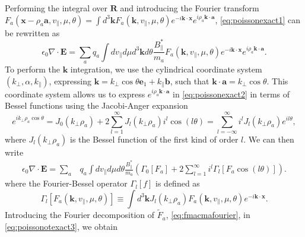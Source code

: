 {{Performing the integral over $\mathbf R$ and introducing the Fourier transform $F_a(\mathbf x - \rho_a \mathbf a,v_\parallel, \mu, \theta) = \int d^3\mathbf k F_a(\mathbf k,v_\parallel, \mu, \theta) e^{-i \mathbf k \cdot \mathbf x} e^{i \rho_a \mathbf k \cdot \mathbf a}$, \cref{eq:poissonexact1} can be rewritten as
%
\begin{equation}
    \epsilon_0 \nabla \cdot \mathbf E = \sum_a q_a \int  dv_\parallel d\mu d^3 \mathbf k d\theta \frac{B_\parallel^*}{m_a} F_a(\mathbf k, v_\parallel, \mu, \theta)e^{-i \mathbf k \cdot \mathbf x} e^{i \rho_a \mathbf k \cdot \mathbf a}.
    \label{eq:poissonexact2}
\end{equation}
%
To perform the $\mathbf k$ integration, we use the cylindrical coordinate system $(k_{\perp}, \alpha, k_\parallel)$, expressing $\mathbf k = k_\perp \cos \theta \mathbf e_1+k_\parallel \mathbf b$, such that $\mathbf k \cdot \mathbf a = k_\perp \cos \theta$. This coordinate system allows us to express $e^{i  \rho_a \mathbf k \cdot \mathbf a}$ in \cref{eq:poissonexact2} in terms of Bessel functions using the Jacobi-Anger expansion \citep{Andrews1992}
%
\begin{equation}
    e^{i k_\perp \rho_a \cos \theta} = J_0(k_\perp \rho_a) + 2 \sum_{l=1}^{\infty} J_l(k_\perp \rho_a) i^l \cos (l \theta) = \sum_{l=-\infty}^{\infty}i^l J_l(k_\perp \rho_a)e^{i l \theta},
\label{eq:jacobianger}
\end{equation}
%
where $J_l(k_\perp \rho_a)$ is the Bessel function of the first kind of order $l$. We can then write
%
\begin{equation}
\begin{split}
    \epsilon_0 \nabla \cdot \mathbf E = \sum_a &q_a \int  dv_\parallel d\mu d\theta \frac{B_\parallel^*}{m_a}  \left(  \Gamma_0[F_a]+  2\sum_{l=1}^{\infty} i^l \Gamma_l[F_a \cos(l\theta) ]\right).    
\end{split}
\label{eq:poissonotexact3}
\end{equation}
%
where the Fourier-Bessel operator $\Gamma_l[f]$ is defined as
%
\begin{equation}
    \Gamma_l[F_a(\mathbf k, v_\parallel, \mu, \theta)] \equiv \int d^3 \mathbf k J_l(k_\perp \rho_a) F_a(\mathbf k, v_\parallel, \mu, \theta) e^{-i \mathbf k \cdot \mathbf x}.
\label{eq:fourbesseloperator}
\end{equation}
%
Introducing the Fourier decomposition of $\tilde F_a$, \cref{eq:fmacmafourier}, in  \cref{eq:poissonotexact3}, we obtain
%
\begin{equation}
\begin{split}

\end{split}
\end{equation}}}
